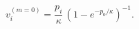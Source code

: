 \begin{equation}\label{20}
 v^{(m=0)}_i =   \frac{p_i}\kappa\,
 \left( 1 -e^{-  {p_0}/\kappa}\right)^{-1}.
\end{equation}

